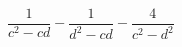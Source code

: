 \begin{ex}[type=expression]
	\begin{condition}
		\( \dfrac{1}{c^2-cd}-\dfrac{1}{d^2-cd}-\dfrac{4}{c^2-d^2} \)
	\end{condition}
\end{ex}